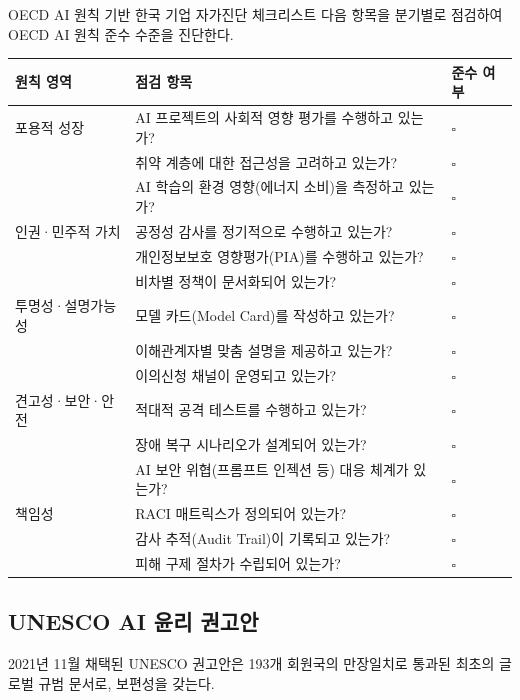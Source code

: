 \begin{practicaltool}{OECD AI 원칙 기반 한국 기업 자가진단 체크리스트}
다음 항목을 분기별로 점검하여 OECD AI 원칙 준수 수준을 진단한다.

\begin{center}
\renewcommand{\arraystretch}{1.3}
\small
\begin{tabularx}{\textwidth}{p{}Xp{}}
\toprule
\textbf{원칙 영역} & \textbf{점검 항목} & \textbf{준수 여부} \\
\midrule
포용적 성장 & AI 프로젝트의 사회적 영향 평가를 수행하고 있는가? & $\square$ \\
 & 취약 계층에 대한 접근성을 고려하고 있는가? & $\square$ \\
 & AI 학습의 환경 영향(에너지 소비)을 측정하고 있는가? & $\square$ \\
\midrule
인권·민주적 가치 & 공정성 감사를 정기적으로 수행하고 있는가? & $\square$ \\
 & 개인정보보호 영향평가(PIA)를 수행하고 있는가? & $\square$ \\
 & 비차별 정책이 문서화되어 있는가? & $\square$ \\
\midrule
투명성·설명가능성 & 모델 카드(Model Card)를 작성하고 있는가? & $\square$ \\
 & 이해관계자별 맞춤 설명을 제공하고 있는가? & $\square$ \\
 & 이의신청 채널이 운영되고 있는가? & $\square$ \\
\midrule
견고성·보안·안전 & 적대적 공격 테스트를 수행하고 있는가? & $\square$ \\
 & 장애 복구 시나리오가 설계되어 있는가? & $\square$ \\
 & AI 보안 위협(프롬프트 인젝션 등) 대응 체계가 있는가? & $\square$ \\
\midrule
책임성 & RACI 매트릭스가 정의되어 있는가? & $\square$ \\
 & 감사 추적(Audit Trail)이 기록되고 있는가? & $\square$ \\
 & 피해 구제 절차가 수립되어 있는가? & $\square$ \\
\bottomrule
\end{tabularx}
\end{center}
\end{practicaltool}

\subsection{UNESCO AI 윤리 권고안}
2021년 11월 채택된 UNESCO 권고안은 193개 회원국의 만장일치로 통과된 최초의 글로벌 규범 문서로, 보편성을 갖는다.\cite{unesco2021ethics}

